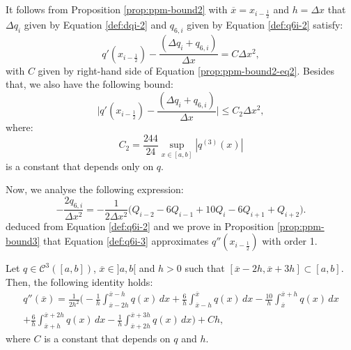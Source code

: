 \begin{corollary}
	\label{prop:ppm-bound2-corollary}
	It follows from Proposition \ref{prop:ppm-bound2} with $\overline{x} = x_{i-\frac{1}{2}}$
	and $h = \Delta x$
	that $\Delta q_i$ given by Equation \eqref{def:dqi-2} 
	and $q_{6,i}$ given by Equation \eqref{def:q6i-2}
 satisfy:
	\begin{equation}
	q'(x_{i-\frac{1}{2}})-\frac{(\Delta q_i + q_{6, i})}{\Delta x}  = C\Delta x^2,
	\end{equation}
	with $C$ given by right-hand side of Equation \eqref{prop:ppm-bound2-eq2}.
	Besides that, we also have the following bound:
	\begin{equation}
		\label{ppm-edge-bound2}
		\bigg|q'(x_{i-\frac{1}{2}})-\frac{(\Delta q_i + q_{6, i})}{\Delta x} \bigg| \leq C_2\Delta x^2,
	\end{equation}
	where:
	\begin{equation}
		\label{ppm-cte-bound2}
		C_2 = \frac{244}{24}\sup_{x \in [a,b]}{|q^{(3)}(x)|}
	\end{equation}
	is a constant that depends only on $q$.
\end{corollary}

Now, we analyse the following expression:
\begin{equation}
	\label{def:q6i-3}
	-\frac{2q_{6,i}}{\Delta x^2} = 
	-\frac{1}{2\Delta x^2} \bigg( Q_{i-2} - 6Q_{i-1} + 10Q_{i} -6Q_{i+1}  + Q_{i+2} \bigg).
\end{equation}
deduced from Equation \eqref{def:q6i-2}
and we prove in Proposition \ref{prop:ppm-bound3} that Equation \eqref{def:q6i-3}
approximates $q''(x_{i-\frac{1}{2}})$ with order 1.
\begin{prop}
	\label{prop:ppm-bound3}
	Let $q \in \mathcal{C}^{3}([a,b])$, $\overline{x} \in ]a,b[$
	and $h>0$ such that $ [\overline{x}-2h,\overline{x}+3h] \subset [a,b]$.
	Then, the following identity holds:
	\begin{equation}
		\begin{split}
		\label{prop:ppm-bound3-eq1}
		q''(\overline{x} ) = \frac{1}{2h^2}
		\bigg(-\frac{1}{h} \int_{\overline{x}-2h}^{\overline{x}-h} q(x) \,dx 
		      +\frac{6}{h}\int_{\overline{x}-h}^{\overline{x}} q(x) \,dx   
		      -\frac{10}{h}\int_{\overline{x}}^{\overline{x}+h} q(x) \,dx  \\ 
		      +\frac{6}{h} \int_{\overline{x}+h}^{\overline{x}+2h} q(x) \,dx   
		      -\frac{1}{h} \int_{\overline{x}+2h}^{\overline{x}+3h} q(x) \,dx   
		\bigg) + Ch,
		\end{split}
	\end{equation}
	where $C$ is a constant that depends on $q$ and $h$.
\end{prop}

